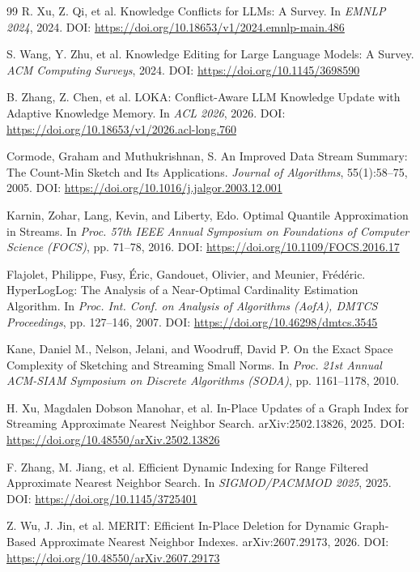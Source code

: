 \begin{thebibliography}{99}
 R. Xu, Z. Qi, et al. Knowledge Conflicts for LLMs: A Survey. In \emph{EMNLP 2024}, 2024. DOI: \url{https://doi.org/10.18653/v1/2024.emnlp-main.486}

 S. Wang, Y. Zhu, et al. Knowledge Editing for Large Language Models: A Survey. \emph{ACM Computing Surveys}, 2024. DOI: \url{https://doi.org/10.1145/3698590}

 B. Zhang, Z. Chen, et al. LOKA: Conflict-Aware LLM Knowledge Update with Adaptive Knowledge Memory. In \emph{ACL 2026}, 2026. DOI: \url{https://doi.org/10.18653/v1/2026.acl-long.760}

 Cormode, Graham and Muthukrishnan, S. An Improved Data Stream Summary: The Count-Min Sketch and Its Applications. \emph{Journal of Algorithms}, 55(1):58–75, 2005. DOI: \url{https://doi.org/10.1016/j.jalgor.2003.12.001}

 Karnin, Zohar, Lang, Kevin, and Liberty, Edo. Optimal Quantile Approximation in Streams. In \emph{Proc. 57th IEEE Annual Symposium on Foundations of Computer Science (FOCS)}, pp. 71–78, 2016. DOI: \url{https://doi.org/10.1109/FOCS.2016.17}

 Flajolet, Philippe, Fusy, Éric, Gandouet, Olivier, and Meunier, Frédéric. HyperLogLog: The Analysis of a Near-Optimal Cardinality Estimation Algorithm. In \emph{Proc. Int. Conf. on Analysis of Algorithms (AofA), DMTCS Proceedings}, pp. 127–146, 2007. DOI: \url{https://doi.org/10.46298/dmtcs.3545}

 Kane, Daniel M., Nelson, Jelani, and Woodruff, David P. On the Exact Space Complexity of Sketching and Streaming Small Norms. In \emph{Proc. 21st Annual ACM-SIAM Symposium on Discrete Algorithms (SODA)}, pp. 1161–1178, 2010.

 H. Xu, Magdalen Dobson Manohar, et al. In-Place Updates of a Graph Index for Streaming Approximate Nearest Neighbor Search. arXiv:2502.13826, 2025. DOI: \url{https://doi.org/10.48550/arXiv.2502.13826}

 F. Zhang, M. Jiang, et al. Efficient Dynamic Indexing for Range Filtered Approximate Nearest Neighbor Search. In \emph{SIGMOD/PACMMOD 2025}, 2025. DOI: \url{https://doi.org/10.1145/3725401}

 Z. Wu, J. Jin, et al. MERIT: Efficient In-Place Deletion for Dynamic Graph-Based Approximate Nearest Neighbor Indexes. arXiv:2607.29173, 2026. DOI: \url{https://doi.org/10.48550/arXiv.2607.29173}


\end{thebibliography}
